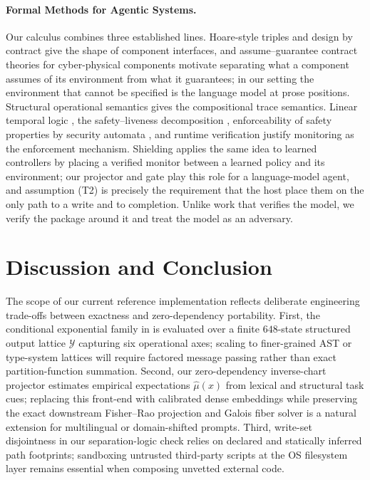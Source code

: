 \documentclass[11pt]{article}
\theoremstyle{definition}
\theoremstyle{plain}
\newcommand{\Ycal}{\mathcal{Y}}
\begin{document}
\paragraph{Formal Methods for Agentic Systems.}
Our calculus combines three established lines. Hoare-style triples \citep{hoare1969axiomatic} and design by contract \citep{meyer1992applying} give the shape of component interfaces, and assume--guarantee contract theories for cyber-physical components \citep{benveniste2018contracts} motivate separating what a component assumes of its environment from what it guarantees; in our setting the environment that cannot be specified is the language model at prose positions. Structural operational semantics \citep{plotkin2004structural} gives the compositional trace semantics. Linear temporal logic \citep{pnueli1977temporal}, the safety--liveness decomposition \citep{alpern1985defining}, enforceability of safety properties by security automata \citep{schneider2000enforceable}, and runtime verification \citep{leucker2009brief} justify monitoring as the enforcement mechanism. Shielding \citep{alshiekh2018safe} applies the same idea to learned controllers by placing a verified monitor between a learned policy and its environment; our projector and gate play this role for a language-model agent, and assumption (T2) is precisely the requirement that the host place them on the only path to a write and to completion. Unlike work that verifies the model, we verify the package around it and treat the model as an adversary.

\section{Discussion and Conclusion}
\label{sec:conclusion}

The scope of our current reference implementation reflects deliberate engineering trade-offs between exactness and zero-dependency portability. First, the conditional exponential family in  is evaluated over a finite $648$-state structured output lattice $\Ycal$ capturing six operational axes; scaling to finer-grained AST or type-system lattices will require factored message passing rather than exact partition-function summation. Second, our zero-dependency inverse-chart projector estimates empirical expectations $\hat{\mu}(x)$ from lexical and structural task cues; replacing this front-end with calibrated dense embeddings while preserving the exact downstream Fisher--Rao projection and Galois fiber solver is a natural extension for multilingual or domain-shifted prompts. Third, write-set disjointness in our separation-logic check relies on declared and statically inferred path footprints; sandboxing untrusted third-party scripts at the OS filesystem layer remains essential when composing unvetted external code.
\end{document}
